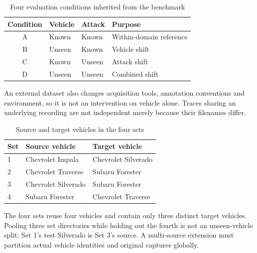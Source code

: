 \documentclass[12pt,a4paper,oneside,openany]{extbook}
\begin{document}
\begin{table}[htbp]\centering
\caption{Four evaluation conditions inherited from the benchmark}\label{tab:conditions}
\begin{tabular}{clll}\toprule Condition & Vehicle & Attack & Purpose\\\midrule
A & Known & Known & Within-domain reference\\
B & Unseen & Known & Vehicle shift\\
C & Known & Unseen & Attack shift\\
D & Unseen & Unseen & Combined shift\\\bottomrule\end{tabular}
\end{table}

An external dataset also changes acquisition tools, annotation conventions and environment, so it is not an intervention on vehicle alone. Traces sharing an underlying recording are not independent merely because their filenames differ.

\begin{table}[htbp]\centering
\caption{Source and target vehicles in the four sets}\label{tab:vehicle_pairs}
\begin{tabular}{lll}\toprule Set & Source vehicle & Target vehicle\\\midrule
1 & Chevrolet Impala & Chevrolet Silverado\\
2 & Chevrolet Traverse & Subaru Forester\\
3 & Chevrolet Silverado & Subaru Forester\\
4 & Subaru Forester & Chevrolet Traverse\\\bottomrule\end{tabular}
\end{table}

The four sets reuse four vehicles and contain only three distinct target vehicles. Pooling three set directories while holding out the fourth is not an unseen-vehicle split: Set 1's test Silverado is Set 3's source. A multi-source extension must partition actual vehicle identities and original captures globally.

\clearpage
\end{document}
